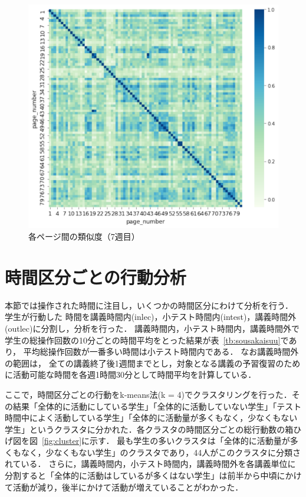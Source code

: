 \documentclass[a4paper,12pt]{ltjsreport}
\begin{document}
\begin{figure}[tbp]
  \centering
  \includegraphics[scale=0.35]{7cos.pdf}
  \caption{各ページ間の類似度（7週目）}
  \label{fig:7cos}
\end{figure}


\section{時間区分ごとの行動分析}

本節では操作された時間に注目し，いくつかの時間区分にわけて分析を行う．
学生が行動した
時間を講義時間内(inlec)，小テスト時間内(intest)，講義時間外(outlec)に分割し，分析を行った．
講義時間内，小テスト時間内，講義時間外で学生の総操作回数の10分ごとの時間平均をとった結果が表~\ref{tb:sousakaisuu}であり，
平均総操作回数が一番多い時間は小テスト時間内である．
なお講義時間外の範囲は，
全ての講義終了後1週間までとし，対象となる講義の予習復習のために活動可能な時間を各週1時間30分として時間平均を計算している．

ここで，時間区分ごとの行動をk-means法(k = 4)でクラスタリングを行った．その結果「全体的に活動にしている学生」「全体的に活動していない学生」「テスト時間中によく活動している学生」「全体的に活動量が多くもなく，少なくもない学生」というクラスタに分かれた．各クラスタの時間区分ごとの総行動数の箱ひげ図を図~\ref{fig:cluster}に示す．
最も学生の多いクラスタは「全体的に活動量が多くもなく，少なくもない学生」のクラスタであり，44人がこのクラスタに分類されている．
さらに，講義時間内，小テスト時間内，講義時間外を各講義単位に分割すると「全体的に活動はしているが多くはない学生」は前半から中頃にかけて活動が減り，後半にかけて活動が増えていることがわかった．
\end{document}
